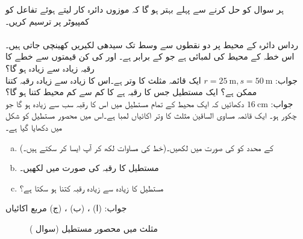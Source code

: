 ہر سوال کو حل کرنے سے پہلے بہتر ہو گا کہ موزوں دائرہ کار لیتے ہوئے تفاعل کو کمپیوٹر پر ترسیم کریں۔\\
\\
رداس   دائرہ کے محیط پر دو نقطوں سے وسط تک سیدھی لکیریں کھینچی جاتی ہیں۔اس خطہ کے محیط کی لمبائی  ہے جو  کے برابر ہے۔ اور  کی کن قیمتوں سے خطے کا رقبہ زیادہ سے زیادہ ہو گا؟\\
جواب:\quad
$r=\SI{25}{\meter}, s=\SI{50}{\meter}$
ایک قائمہ مثلث کا وتر  ہے۔اس کا زیادہ سے زیادہ رقبہ کتنا ممکن ہے؟
ایک مستطیل جس کا رقبہ  ہے کا کم سے کم محیط کتنا ہو گا؟\\
جواب:\quad
$\SI{16}{\centi\meter}$
دکھائیں کہ ایک محیط کے تمام مستطیل میں اس کا رقبہ سب سے زیادہ ہو گا جو چکور ہو۔
ایک قائمہ مساوی الساقین مثلث کا وتر  اکائیاں لمبا ہے۔اس میں محصور مستطیل کو شکل  میں دکھایا گیا ہے۔
\begin{enumerate}[a.]
\item
{} کے محدد کو  کی صورت میں لکھیں۔(خط  کی مساوات لکھ کر آپ ایسا کر سکتے ہیں۔)
\item
مستطیل کا رقبہ  کی صورت میں لکھیں۔
\item
مستطیل کا زیادہ سے زیادہ رقبہ کتنا ہو سکتا ہے؟
\end{enumerate}
جواب:\quad
(ا) ، (ب) ، (ج)  مربع اکائیاں
\begin{figure}
\centering
{}
\caption{مثلث میں محصور مستطیل (سوال )}
\label{شکل_سوال_استعمال_مثلث_میں_چکور}
\end{figure}

